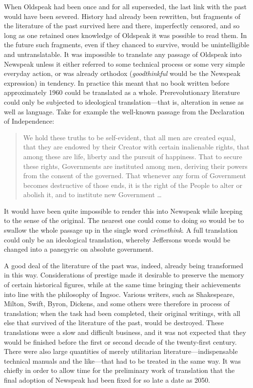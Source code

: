 When Oldspeak had been once and for all superseded, the last link with
the past would have been severed. History had already been rewritten,
but fragments of the literature of the past survived here and there,
imperfectly censored, and so long as one retained one\textquotesingle s
knowledge of Oldspeak it was possible to read them. In the future such
fragments, even if they chanced to survive, would be unintelligible and
untranslatable. It was impossible to translate any passage of Oldspeak
into Newspeak unless it either referred to some technical process or
some very simple everyday action, or was already orthodox
(\emph{goodthinkful} would be the Newspeak expression) in tendency. In
practice this meant that no book written before approximately 1960 could
be translated as a whole. Prerevolutionary literature could only be
subjected to ideological translation---that is, alteration in sense as
well as language. Take for example the well-known passage from the
Declaration of Independence:

\begin{quotation}
We hold these truths to be self-evident, that all men are created
equal, that they are endowed by their Creator with certain inalienable
rights, that among these are life, liberty and the pursuit of happiness.
That to secure these rights, Governments are instituted among men,
deriving their powers from the consent of the governed. That whenever
any form of Government becomes destructive of those ends, it is the
right of the People to alter or abolish it, and to institute new
Government \ldots{}
\end{quotation}

It would have been quite impossible to render this into Newspeak while
keeping to the sense of the original. The nearest one could come to
doing so would be to swallow the whole passage up in the single word
\emph{crimethink}. A full translation could only be an ideological
translation, whereby Jefferson\textquotesingle s words would be changed
into a panegyric on absolute government.

A good deal of the literature of the past was, indeed, already being
transformed in this way. Considerations of prestige made it desirable to
preserve the memory of certain historical figures, while at the same
time bringing their achievements into line with the philosophy of
Ingsoc. Various writers, such as Shakespeare, Milton, Swift, Byron,
Dickens, and some others were therefore in process of translation; when
the task had been completed, their original writings, with all else that
survived of the literature of the past, would be destroyed. These
translations were a slow and difficult business, and it was not expected
that they would be finished before the first or second decade of the
twenty-first century. There were also large quantities of merely
utilitarian literature---indispensable technical manuals and the
like---that had to be treated in the same way. It was chiefly in order
to allow time for the preliminary work of translation that the final
adoption of Newspeak had been fixed for so late a date as 2050.
